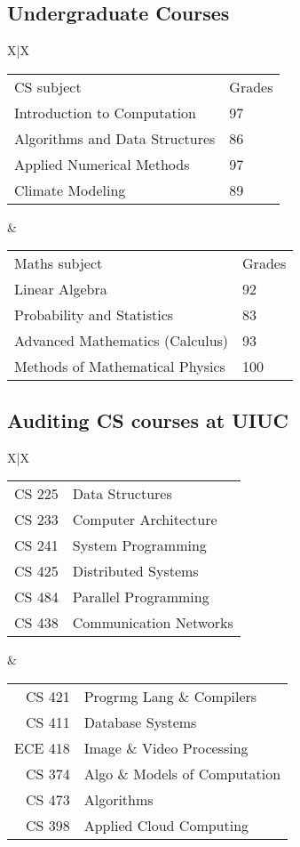\documentclass{res}
\let\oldsubsection\subsection
\renewcommand{\subsection}[1]{\vspace{-0.2in}\oldsubsection{#1}\vspace{-0.25in}}
\begin{document}
\begin{resume}
\subsection{Undergraduate Courses}
\begin{tabularx}{\textwidth}{X|X}
	\begin{tabular}{ll}
		CS subject & Grades\\
		Introduction to Computation & 97\\
		Algorithms and Data Structures & 86\\
		Applied Numerical Methods & 97\\
		Climate Modeling & 89\\	
	\end{tabular}
	&
	\begin{tabular}{ll}
		Maths subject & Grades\\
		Linear Algebra & 92\\
		Probability and Statistics & 83\\
		Advanced Mathematics (Calculus) & 93\\
		Methods of Mathematical Physics & 100\\
	\end{tabular}
\end{tabularx}%
\vspace{-0.2in}
\subsection{Auditing CS courses at UIUC}
\begin{tabularx}{\textwidth}{X|X}
	\begin{tabular}{rl}
		CS 225 & Data Structures\\
		CS 233 & Computer Architecture\\
		CS 241 & System Programming\\
		CS 425 & Distributed Systems\\
		CS 484 & Parallel Programming\\
		CS 438 & Communication Networks\\
	\end{tabular}
	&
	\begin{tabular}{rl}
		CS 421 & Progrmg Lang \& Compilers\\
		CS 411 & Database Systems\\
		ECE 418 & Image \& Video Processing\\
		CS 374 & Algo \& Models of Computation\\
		CS 473 & Algorithms\\
		CS 398 & Applied Cloud Computing\\
	\end{tabular}
\end{tabularx}\\
\vspace{-0.1in}


\end{resume}
\end{document}

